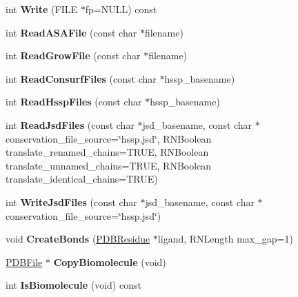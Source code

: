 \begin{DoxyCompactItemize}
\item 
int {\bfseries Write} (F\+I\+LE $\ast$fp=N\+U\+LL) const \hypertarget{class_p_d_b_file_a3a8e6ee724c4948222452f11f2ca0d83}{}\label{class_p_d_b_file_a3a8e6ee724c4948222452f11f2ca0d83}

\item 
int {\bfseries Read\+A\+S\+A\+File} (const char $\ast$filename)\hypertarget{class_p_d_b_file_aba9397d2dd852eb4bbf4f79334f9579f}{}\label{class_p_d_b_file_aba9397d2dd852eb4bbf4f79334f9579f}

\item 
int {\bfseries Read\+Grow\+File} (const char $\ast$filename)\hypertarget{class_p_d_b_file_ad6b4e20e3309576dc5d693d154afa11c}{}\label{class_p_d_b_file_ad6b4e20e3309576dc5d693d154afa11c}

\item 
int {\bfseries Read\+Consurf\+Files} (const char $\ast$hssp\+\_\+basename)\hypertarget{class_p_d_b_file_a281aaa99ed47d98ed802dbf4dcce6297}{}\label{class_p_d_b_file_a281aaa99ed47d98ed802dbf4dcce6297}

\item 
int {\bfseries Read\+Hssp\+Files} (const char $\ast$hssp\+\_\+basename)\hypertarget{class_p_d_b_file_a8f2d7611d52f35cf848b313153ce6502}{}\label{class_p_d_b_file_a8f2d7611d52f35cf848b313153ce6502}

\item 
int {\bfseries Read\+Jsd\+Files} (const char $\ast$jsd\+\_\+basename, const char $\ast$conservation\+\_\+file\+\_\+source=\char`\"{}hssp.\+jsd\char`\"{}, R\+N\+Boolean translate\+\_\+renamed\+\_\+chains=T\+R\+UE, R\+N\+Boolean translate\+\_\+unnamed\+\_\+chains=T\+R\+UE, R\+N\+Boolean translate\+\_\+identical\+\_\+chains=T\+R\+UE)\hypertarget{class_p_d_b_file_a0fe9dabe94beade3ce64a0e5778f0e49}{}\label{class_p_d_b_file_a0fe9dabe94beade3ce64a0e5778f0e49}

\item 
int {\bfseries Write\+Jsd\+Files} (const char $\ast$jsd\+\_\+basename, const char $\ast$conservation\+\_\+file\+\_\+source=\char`\"{}hssp.\+jsd\char`\"{})\hypertarget{class_p_d_b_file_a58ba0e2d7f3e5c37e788ef6522bb3ae4}{}\label{class_p_d_b_file_a58ba0e2d7f3e5c37e788ef6522bb3ae4}

\item 
void {\bfseries Create\+Bonds} (\hyperlink{class_p_d_b_residue}{P\+D\+B\+Residue} $\ast$ligand, R\+N\+Length max\+\_\+gap=1)\hypertarget{class_p_d_b_file_a55934f124fb7a7894237cf85d6c154a1}{}\label{class_p_d_b_file_a55934f124fb7a7894237cf85d6c154a1}

\item 
\hyperlink{class_p_d_b_file}{P\+D\+B\+File} $\ast$ {\bfseries Copy\+Biomolecule} (void)\hypertarget{class_p_d_b_file_af3f77d143124d001369d235c67ac7a8f}{}\label{class_p_d_b_file_af3f77d143124d001369d235c67ac7a8f}

\item 
int {\bfseries Is\+Biomolecule} (void) const \hypertarget{class_p_d_b_file_a4a05803afb0295edcec380d20965f975}{}\label{class_p_d_b_file_a4a05803afb0295edcec380d20965f975}

\end{DoxyCompactItemize}
